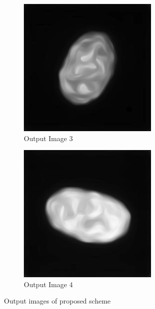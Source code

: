 \documentclass[a4paper,11pt]{ijamas}
\begin{document}
\begin{figure}[!h]
\begin{subfigure}{.48\textwidth}
  \centering
  \includegraphics[width=0.80\columnwidth]{./figs/4diffused.jpg}
 \caption{Output Image 3}
  \label{fig:outputimage_4}
\end{subfigure}%
\begin{subfigure}{.48\textwidth}
  \centering
  \includegraphics[width=0.80\columnwidth]{./figs/5diffused.jpg}
 \caption{Output Image 4}
  \label{fig:outputimage_5}
\end{subfigure}%
\caption{Output images of proposed scheme}
\label{fig:outputimages}
\end{figure}
\end{document}
